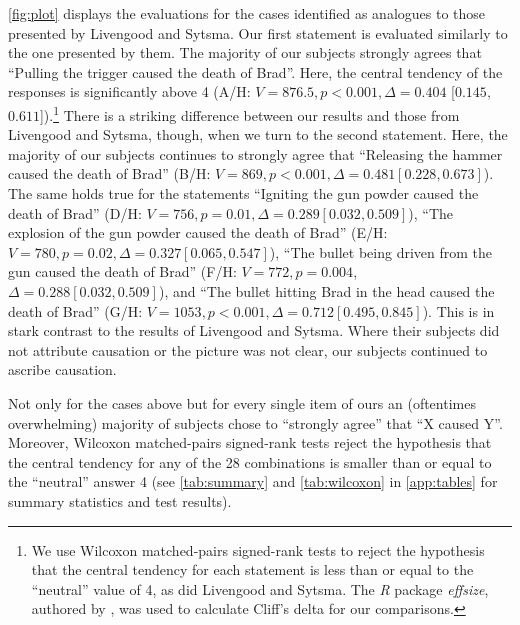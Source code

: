 \documentclass[12pt]{scrartcl}
\begin{document}
\noindent\autoref{fig:plot} displays the evaluations for the cases identified as analogues to those presented by Livengood and Sytsma. Our first statement is evaluated similarly to the one presented by them. The majority of our subjects strongly agrees that \enquote{Pulling the trigger caused the death of Brad}. Here, the central tendency of the responses is significantly above 4 (A/H: $V = 876.5, p < 0.001, \Delta = 0.404$ [$0.145,$ $0.611$]).\footnote{We use Wilcoxon matched-pairs signed-rank tests to reject the hypothesis that the central tendency for each statement is less than or equal to the \enquote{neutral} value of 4, as did Livengood and Sytsma. The \emph{R} package \emph{effsize}, authored by \cite{torchiano_effsize_2020}, was used to calculate Cliff's delta for our comparisons.} There is a striking difference between our results and those from Livengood and Sytsma, though, when we turn to the second statement. Here, the majority of our subjects continues to strongly agree that \enquote{Releasing the hammer caused the death of Brad} (B/H: $V = 869, p < 0.001, \Delta= 0.481 \left[0.228, 0.673\right]$). The same holds true for the statements \enquote{Igniting the gun powder caused the death of Brad} (D/H: $V = 756, p = 0.01, \Delta = 0.289 \left[0.032, 0.509\right]$), \enquote{The explosion of the gun powder caused the death of Brad} (E/H: $V = 780, p = 0.02, \Delta = 0.327 \left[0.065, 0.547\right]$), \enquote{The bullet being driven from the gun caused the death of Brad} (F/H: $V = 772, p = 0.004$, $\Delta = 0.288 \left[0.032, 0.509\right]$), and \enquote{The bullet hitting Brad in the head caused the death of Brad} (G/H: $V = 1053, p < 0.001, \Delta = 0.712 [0.495, 0.845]$). This is in stark contrast to the results of Livengood and Sytsma. Where their subjects did not attribute causation or the picture was not clear, our subjects continued to ascribe causation.

Not only for the cases above but for every single item of ours an (oftentimes overwhelming) majority of subjects chose to \enquote{strongly agree} that \enquote{X caused Y}. Moreover, Wilcoxon matched-pairs signed-rank tests reject the hypothesis that the central tendency for any of the 28 combinations is smaller than or equal to the \enquote{neutral} answer 4 (see \autoref{tab:summary} and \autoref{tab:wilcoxon} in \autoref{app:tables} for summary statistics and test results).
\end{document}
